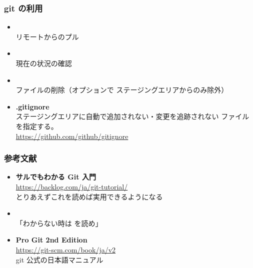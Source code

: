 \begin{frame}
	\frametitle{git の利用}
	\begin{itemize}
		\item {}\\
			リモートからのプル
		\item {}\\
			現在の状況の確認
		\item {}\\
			ファイルの削除（オプションで
			ステージングエリアからのみ除外）
		\item \textbf{.gitignore}\\
			ステージングエリアに自動で追加されない・変更を追跡されない
			ファイルを指定する。\\
			\url{https://github.com/github/gitignore}
	\end{itemize}
\end{frame}

\begin{frame}
	\frametitle{参考文献}
	\begin{itemize}
		\item \textbf{サルでもわかる Git 入門}\\
			\url{https://backlog.com/ja/git-tutorial/}\\
			とりあえずこれを読めば実用できるようになる
		\item {} \\
			「わからない時は  を読め」
		\item \textbf{Pro Git 2nd Edition}\\
			\url{https://git-scm.com/book/ja/v2}\\
			git 公式の日本語マニュアル
	\end{itemize}
\end{frame}

